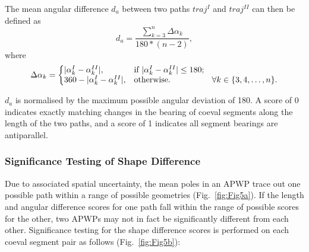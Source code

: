 The mean angular difference $d_a$ between two paths $traj^I$ and $traj^{II}$ can
then be defined as
%
\begin{equation*}
  d_a = \frac{\sum\limits_{k=3}^n \Delta\alpha_k}{180* (n-2)},
\label{eq:ad}
\end{equation*}
%
where
%
\begin{equation*}
\Delta\alpha_k =
\left\{
\begin{array}{@{}ll@{}}
| \alpha_k^I - \alpha_k^{II} |, & \text{if}\ | \alpha_k^I -
\alpha_k^{II} | \leq180; \\
360 - | \alpha_k^I - \alpha_k^{II} |, &
  \text{otherwise}.\quad\quad\quad\quad\quad\forall k \in \{3,4,\ldots,n\}.
\end{array}
\right.\label{eq:diffAziChange}
\end{equation*}

$d_a$ is normalised by the maximum possible angular deviation of 180\degree. A
score of 0 indicates exactly matching changes in the bearing of coeval segments
along the length of the two paths, and a score of 1 indicates all segment
bearings are antiparallel.

\subsubsection{Significance Testing of Shape Difference}\label{sec:shapeSigTest}

Due to associated spatial uncertainty, the mean poles in an APWP trace out one
possible path within a range of possible geometries (Fig.~\ref{fig:Fig5a}). If
the length and angular difference scores for one path fall within the range of
possible scores for the other, two APWPs may not in fact be significantly
different from each other. Significance testing for the shape difference scores
is performed on each coeval segment pair as follows (Fig.~\ref{fig:Fig5b}):

